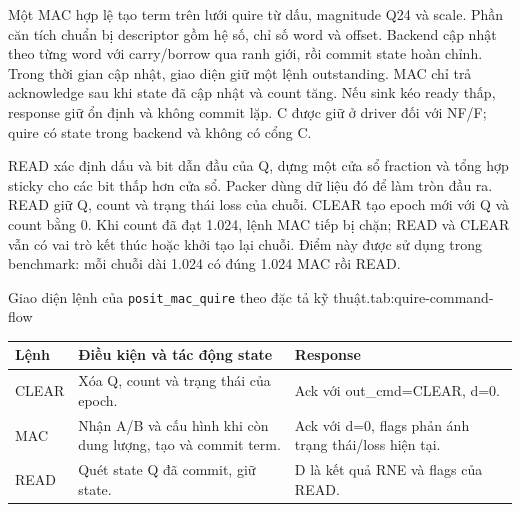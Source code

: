 Một MAC hợp lệ tạo term trên lưới quire từ dấu, magnitude
Q24 và scale. Phần căn tích chuẩn bị descriptor gồm hệ số,
chỉ số word và offset. Backend cập nhật theo từng word với
carry/borrow qua ranh giới, rồi commit state hoàn chỉnh.
Trong thời gian cập nhật, giao diện giữ một lệnh outstanding.
MAC chỉ trả acknowledge sau khi state đã cập nhật và count
tăng. Nếu sink kéo ready thấp, response giữ ổn định và không
commit lặp. C được giữ ở driver đối với NF/F; quire có state
trong backend và không có cổng C.

READ xác định dấu và bit dẫn đầu của Q, dựng một cửa sổ
fraction và tổng hợp sticky cho các bit thấp hơn cửa sổ.
Packer dùng dữ liệu đó để làm tròn đầu ra. READ giữ Q,
count và trạng thái loss của chuỗi. CLEAR tạo epoch mới
với Q và count bằng 0. Khi count đã đạt 1.024, lệnh MAC
tiếp bị chặn; READ và CLEAR vẫn có vai trò kết thúc hoặc
khởi tạo lại chuỗi. Điểm này được sử dụng trong benchmark:
mỗi chuỗi dài 1.024 có đúng 1.024 MAC rồi READ.

\begin{engineeringtable}{Giao diện lệnh của \texttt{posit\_mac\_quire} theo đặc tả kỹ thuật.}{tab:quire-command-flow}
\begin{tabularx}{\linewidth}{@{}>{\raggedright\arraybackslash}p{22mm}Y Y@{}}
\toprule
Lệnh & Điều kiện và tác động state & Response \\
\midrule
CLEAR & Xóa Q, count và trạng thái của epoch. & Ack với out\_cmd=CLEAR, d=0. \\
MAC & Nhận A/B và cấu hình khi còn dung lượng, tạo và commit term. & Ack với d=0, flags phản ánh trạng thái/loss hiện tại. \\
READ & Quét state Q đã commit, giữ state. & D là kết quả RNE và flags của READ. \\
\bottomrule
\end{tabularx}
\end{engineeringtable}
